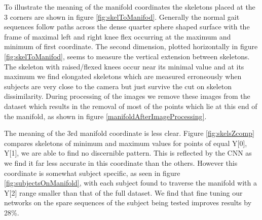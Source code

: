\documentclass[11pt]{article} %
\begin{document}
To illustrate the meaning of the manifold coordinates the skeletons placed at the 3 corners are shown in figure \ref{fig:skelToManifod}. Generally the normal gait sequences follow paths across the dense quarter sphere shaped surface with the frame of maximal left and right knee flex occurring at the maximum and minimum of first coordinate. The second dimension, plotted horizontally in figure \ref{fig:skelToManifod}, seems to measure the vertical extension between skeletons. The skeleton with raised/flexed knees occur near its minimal value and at its maximum we find elongated skeletons which are measured erroneously when subjects are very close to the camera but just survive the cut on skeleton dissimilarity. During processing of the images we remove these images from the dataset which results in the removal of most of the points which lie at this end of the manifold, as shown in figure \ref{manifoldAfterImageProcessing}. 

The meaning of the 3rd manifold coordinate is less clear. Figure \ref{fig:skelsZcomp} compares skeletons of minimum and maximum values for points of equal Y[0], Y[1], we are able to find no discernible pattern. This is reflected by the CNN as we find it far less accurate in this coordinate than the others. However this coordinate is somewhat subject specific, as seen in figure \ref{fig:subjectsOnManifold}, with each subject found to traverse the manifold with a Y[2] range smaller than that of the full dataset. We find that fine tuning our networks on the spare sequences of the subject being tested improves results by 28\%. 



\end{document}

